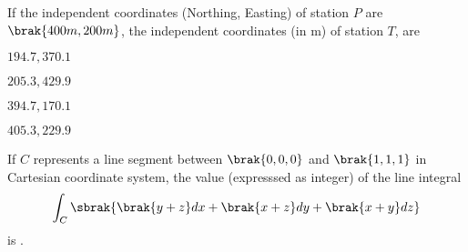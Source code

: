 If the independent coordinates (Northing, Easting) of station $P$ are $\brak{400m, 200m}$,
the independent coordinates (in m) of station $T$, are
\begin{enumerate}
\begin{multicols}{4}
\item $ 194.7, 370.1 $
\item $ 205.3, 429.9 $
\item $ 394.7, 170.1 $
\item $ 405.3, 229.9 $
\end{multicols}
\end{enumerate}

\item If $C$ represents a line segment between $\brak{0, 0, 0}$ and $\brak{1, 1, 1}$ in Cartesian coordinate system, the value (expresssed as integer) of the line integral 
\begin{align}
\int_{C} \sbrak{\brak{y + z} dx + \brak{ x+ z} dy + \brak{x + y} dz} 
\end{align}
is \underline{\hspace{2cm}}.

%
